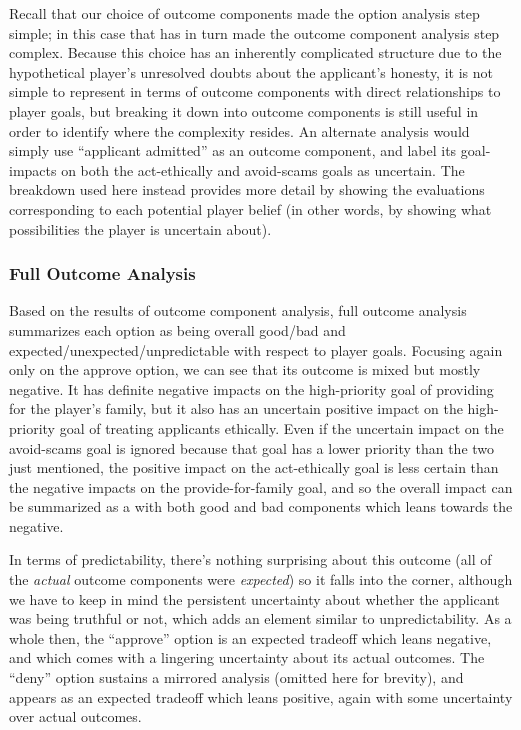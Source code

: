 Recall that our choice of outcome components made the option analysis step simple; in this case that has in turn made the outcome component analysis step complex.
%
Because this choice has an inherently complicated structure due to the hypothetical player's unresolved doubts about the applicant's honesty, it is not simple to represent in terms of outcome components with direct relationships to player goals, but breaking it down into outcome components is still useful in order to identify where the complexity resides.
%
An alternate analysis would simply use ``applicant admitted'' as an outcome component, and label its goal-impacts on both the act-ethically and avoid-scams goals as uncertain.
%
The breakdown used here instead provides more detail by showing the evaluations corresponding to each potential player belief (in other words, by showing what possibilities the player is uncertain about).

\subsubsection{Full Outcome Analysis}

Based on the results of outcome component analysis, full outcome analysis summarizes each option as being overall good/bad and expected/unexpected/unpredictable with respect to player goals.
%
Focusing again only on the approve option, we can see that its outcome is mixed but mostly negative.
%
It has definite negative impacts on the high-priority goal of providing for the player's family, but it also has an uncertain positive impact on the high-priority goal of treating applicants ethically.
%
Even if the uncertain impact on the avoid-scams goal is ignored because that goal has a lower priority than the two just mentioned, the positive impact on the act-ethically goal is less certain than the negative impacts on the provide-for-family goal, and so the overall impact can be summarized as a  with both good and bad components which leans towards the negative.


In terms of predictability, there's nothing surprising about this outcome (all of the \emph{actual} outcome components were \emph{expected}) so it falls into the  corner, although we have to keep in mind the persistent uncertainty about whether the applicant was being truthful or not, which adds an element similar to unpredictability.
%
As a whole then, the ``approve'' option is an expected tradeoff which leans negative, and which comes with a lingering uncertainty about its actual outcomes.
%
The ``deny'' option sustains a mirrored analysis (omitted here for brevity), and appears as an expected tradeoff which leans positive, again with some uncertainty over actual outcomes.



